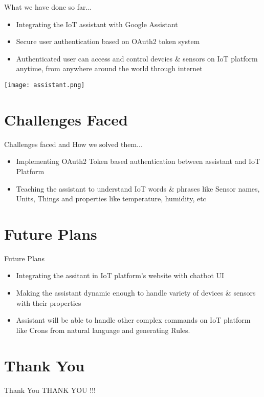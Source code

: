 \documentclass[10pt, a4paper]{beamer}
\begin{document}
\begin{frame}{What we have done so far...}
	\begin{minipage}[b]{0.55\textwidth}
		\raggedright
		\begin{itemize}
			\item Integrating the IoT assistant with Google Assistant
			\newline\\\vspace{0.2cm}
			\item Secure user authentication based on OAuth2 token system
			\newline\\\vspace{0.2cm}
			\item Authenticated user can access and control devcies \& sensors on IoT platform anytime, from anywhere around the world through internet
		\end{itemize}
		\vspace{0.3cm}
	\end{minipage}%
	\begin{minipage}[b]{0.45\textwidth}
		\centering
		\texttt{[image: assistant.png]}
	\end{minipage}%
\end{frame}

\section{Challenges Faced}
\begin{frame}{Challenges faced and How we solved them...}
	\begin{itemize}
		\item Implementing OAuth2 Token based authentication between assistant and IoT Platform
		\newline\\
		\item Teaching the assistant to understand IoT words \& phrases like Sensor names, Units, Things and properties like temperature, humidity, etc
	\end{itemize}
\end{frame}

\section{Future Plans}
\begin{frame}{Future Plans}
	\begin{itemize}
		\item Integrating the assitant in IoT platform's website with chatbot UI
		\newline\\
		\item Making the assistant dynamic enough to handle variety of devices \& sensors with their properties
		\newline\\
		\item Assistant will be able to handle other complex commands on IoT platform like Crons from natural language and generating Rules.
	\end{itemize}
\end{frame}


\section{Thank You}
\begin{frame}{Thank You}
	\centering THANK YOU !!!
\end{frame}
\end{document}
